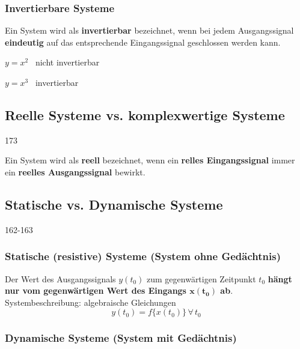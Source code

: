 \subsubsection{Invertierbare Systeme}

Ein System wird als \textbf{invertierbar} bezeichnet, wenn bei jedem Ausgangssignal \textbf{eindeutig} auf das entsprechende 
Eingangssignal geschlossen werden kann.

\vspace{0.2cm}


\begin{minipage}[t]{0.48\columnwidth}
    $y = x^2$ \quad \textrightarrow\ nicht invertierbar
\end{minipage}
\hfill
\begin{minipage}[t]{0.48\columnwidth}
    $y = x^3$ \quad \textrightarrow\ invertierbar 
\end{minipage}


\subsection{Reelle Systeme vs. komplexwertige Systeme}{173}

Ein System wird als \textbf{reell} bezeichnet, wenn ein \textbf{relles Eingangssignal} immer ein \textbf{reelles Ausgangssignal} bewirkt.


\subsection{Statische vs. Dynamische Systeme}{162-163}

\subsubsection{Statische (resistive) Systeme (System ohne Gedächtnis)}


Der Wert des Ausgangssignals $y(t_0)$ zum gegenwärtigen Zeitpunkt $t_0$ \textbf{hängt nur vom gegenwärtigen Wert des Eingangs $\bm{x(t_0)}$ ab}. \\
Systembeschreibung: algebraische Gleichungen 
$$ \boxed{ y(t_0) = f\{x(t_0) \} \, \forall \, t_0  } $$


\subsubsection{Dynamische Systeme (System mit Gedächtnis)}


